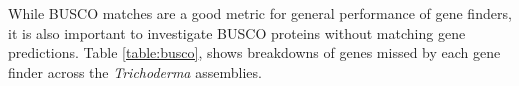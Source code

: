 While BUSCO matches are a good metric for general performance of gene
finders, it is also important to investigate BUSCO proteins without
matching gene predictions. Table \ref{table:busco}, shows breakdowns
of genes missed by each gene finder across the \textit{Trichoderma}
assemblies. 



